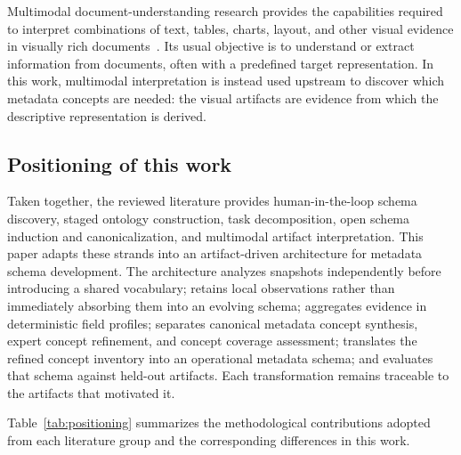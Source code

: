 \documentclass{article}
\begin{document}
Multimodal document-understanding research provides the capabilities required to interpret combinations of text, tables, charts, layout, and other visual evidence in visually rich documents~\citep{wang2025,ding2026vrdu}. Its usual objective is to understand or extract information from documents, often with a predefined target representation. In this work, multimodal interpretation is instead used upstream to discover which metadata concepts are needed: the visual artifacts are evidence from which the descriptive representation is derived.

\subsection{Positioning of this work}

Taken together, the reviewed literature provides human-in-the-loop schema discovery, staged ontology construction, task decomposition, open schema induction and canonicalization, and multimodal artifact interpretation. This paper adapts these strands into an artifact-driven architecture for metadata schema development. The architecture analyzes snapshots independently before introducing a shared vocabulary; retains local observations rather than immediately absorbing them into an evolving schema; aggregates evidence in deterministic field profiles; separates canonical metadata concept synthesis, expert concept refinement, and concept coverage assessment; translates the refined concept inventory into an operational metadata schema; and evaluates that schema against held-out artifacts. Each transformation remains traceable to the artifacts that motivated it.

Table~\ref{tab:positioning} summarizes the methodological contributions adopted from each literature group and the corresponding differences in this work.
\end{document}
